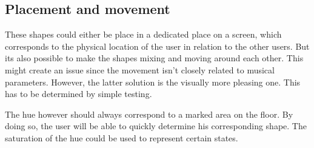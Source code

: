 \documentclass[titlepage, a4paper, 11pt]{scrartcl}
\begin{document}
\subsection{Placement and movement}

These shapes could either be place in a dedicated place on a screen, which corresponds to the physical location of the user in relation to the other users.
But its also possible to make the shapes mixing and moving around each other. This might create an issue since the movement isn't closely related to musical parameters.
However, the latter solution is the visually more pleasing one. This has to be determined by simple testing.

The hue however should always correspond to a marked area on the floor. By doing so, the user will be able to quickly determine his corresponding shape.
The saturation of the hue could be used to represent certain states.
\end{document}
